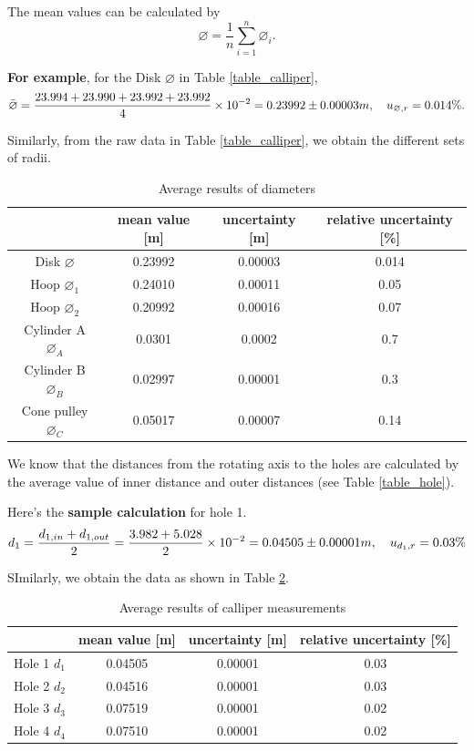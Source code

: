     The mean values can be calculated by
    \[
        \varnothing=\frac{1}{n}\sum_{i=1}^{n}\varnothing_i.
    \]

    \textbf{For example}, for the Disk $\varnothing$ in Table \ref{table_calliper},
    \[
        \bar{\varnothing}=\frac{23.994+23.990+23.992+23.992}{4}\times10^{-2}=0.23992\pm0.00003m,\quad u_{\varnothing,r}=0.014\%.
    \]

    Similarly, from the raw data in Table \ref{table_calliper}, we obtain the different sets of radii.

    \begin{table}[H] \small
        \centering
        \begin{tabular}{|c|c|c|c|}
            \hline
            & mean value [m] & uncertainty [m] & relative uncertainty [\%]\\\hline
            Disk $\varnothing$ & 0.23992 & 0.00003 & 0.014\\\hline
            Hoop $\varnothing_1$ & 0.24010 & 0.00011 & 0.05\\\hline
            Hoop $\varnothing_2$ & 0.20992 & 0.00016 & 0.07\\\hline
            Cylinder A $\varnothing_A$ & 0.0301 & 0.0002 & 0.7 \\\hline
            Cylinder B $\varnothing_B$ & 0.02997 & 0.00001 & 0.3\\\hline
            Cone pulley $\varnothing_C$ & 0.05017 & 0.00007 & 0.14\\\hline
        \end{tabular}
        \caption{Average results of diameters}\label{data_diameter}
    \end{table}
    
    We know that the distances from the rotating axis to the holes are calculated by the average value of inner distance and outer distances (see Table \ref{table_hole}).

    Here's the \textbf{sample calculation} for hole 1.
    \[
        d_1=\frac{d_{1,in}+d_{1,out}}{2}=\frac{3.982+5.028}{2}\times10^{-2}=0.04505\pm 0.00001m,\quad u_{d_1,r}=0.03\%
    \]

    SImilarly, we obtain the data as shown in Table \ref{data_hole}.

    \begin{table}[H] \small
        \centering
        \begin{tabular}{|c|c|c|c|}
            \hline
            & mean value [m] & uncertainty [m] & relative uncertainty [\%]\\\hline
            Hole 1 $d_1$ & 0.04505 & 0.00001 & 0.03\\\hline
            Hole 2 $d_2$ & 0.04516 & 0.00001 & 0.03\\\hline
            Hole 3 $d_3$ & 0.07519 & 0.00001 & 0.02\\\hline
            Hole 4 $d_4$ & 0.07510 & 0.00001 & 0.02\\\hline
        \end{tabular}
        \caption{Average results of calliper measurements}\label{data_hole}
    \end{table}

